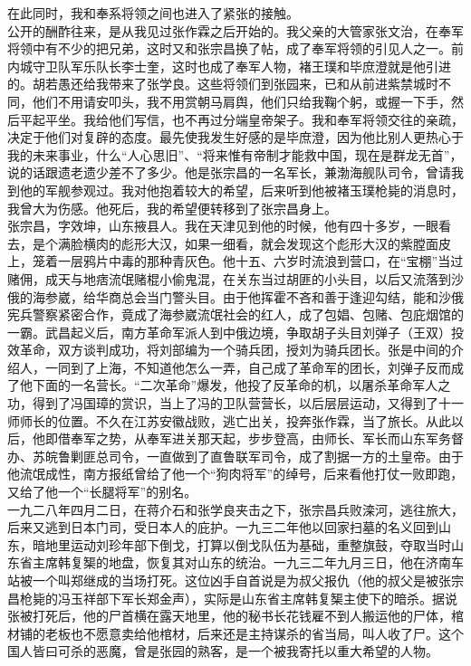 在此同时，我和奉系将领之间也进入了紧张的接触。\\

公开的酬酢往来，是从我见过张作霖之后开始的。我父亲的大管家张文治，在奉军将领中有不少的把兄弟，这时又和张宗昌换了帖，成了奉军将领的引见人之一。前内城守卫队军乐队长李士奎，这时也成了奉军人物，褚王璞和毕庶澄就是他引进的。胡若愚还给我带来了张学良。这些将领们到张园来，已和从前进紫禁城时不同，他们不用请安叩头，我不用赏朝马肩舆，他们只给我鞠个躬，或握一下手，然后平起平坐。我给他们写信，也不再过分端皇帝架子。我和奉军将领交往的亲疏，决定于他们对复辟的态度。最先使我发生好感的是毕庶澄，因为他比别人更热心于我的未来事业，什么“人心思旧”、“将来惟有帝制才能救中国，现在是群龙无首”，说的话跟遗老遗少差不了多少。他是张宗昌的一名军长，兼渤海舰队司令，曾请我到他的军舰参观过。我对他抱着较大的希望，后来听到他被褚玉璞枪毙的消息时，我曾大为伤感。他死后，我的希望便转移到了张宗昌身上。\\

张宗昌，字效坤，山东掖县人。我在天津见到他的时候，他有四十多岁，一眼看去，是个满脸横肉的彪形大汉，如果一细看，就会发现这个彪形大汉的紫膛面皮上，笼着一层鸦片中毒的那种青灰色。他十五、六岁时流浪到营口，在“宝棚”当过赌佣，成天与地痞流氓赌棍小偷鬼混，在关东当过胡匪的小头目，以后又流落到沙俄的海参崴，给华商总会当门警头目。由于他挥霍不吝和善于逢迎勾结，能和沙俄宪兵警察紧密合作，竟成了海参崴流氓社会的红人，成了包娼、包赌、包庇烟馆的一霸。武昌起义后，南方革命军派人到中俄边境，争取胡子头目刘弹子（王双）投效革命，双方谈判成功，将刘部编为一个骑兵团，授刘为骑兵团长。张是中间的介绍人，一同到了上海，不知道他怎么一弄，自己成了革命军的团长，刘弹子反而成了他下面的一名营长。“二次革命”爆发，他投了反革命的机，以屠杀革命军人之功，得到了冯国璋的赏识，当上了冯的卫队营营长，以后层层运动，又得到了十一师师长的位置。不久在江苏安徽战败，逃亡出关，投奔张作霖，当了旅长。从此以后，他即借奉军之势，从奉军进关那天起，步步登高，由师长、军长而山东军务督办、苏皖鲁剿匪总司令，一直做到了直鲁联军司令，成了割据一方的土皇帝。由于他流氓成性，南方报纸曾给了他一个“狗肉将军”的绰号，后来看他打仗一败即跑，又给了他一个“长腿将军”的别名。\\

一九二八年四月二日，在蒋介石和张学良夹击之下，张宗昌兵败滦河，逃往旅大，后来又逃到日本门司，受日本人的庇护。一九三二年他以回家扫墓的名义回到山东，暗地里运动刘珍年部下倒戈，打算以倒戈队伍为基础，重整旗鼓，夺取当时山东省主席韩复榘的地盘，恢复其对山东的统治。一九三二年九月三日，他在济南车站被一个叫郑继成的当场打死。这位凶手自首说是为叔父报仇（他的叔父是被张宗昌枪毙的冯玉祥部下军长郑金声），实际是山东省主席韩复榘主使下的暗杀。据说张被打死后，他的尸首横在露天地里，他的秘书长花钱雇不到人搬运他的尸体，棺材铺的老板也不愿意卖给他棺材，后来还是主持谋杀的省当局，叫人收了尸。这个国人皆曰可杀的恶魔，曾是张园的熟客，是一个被我寄托以重大希望的人物。\\

